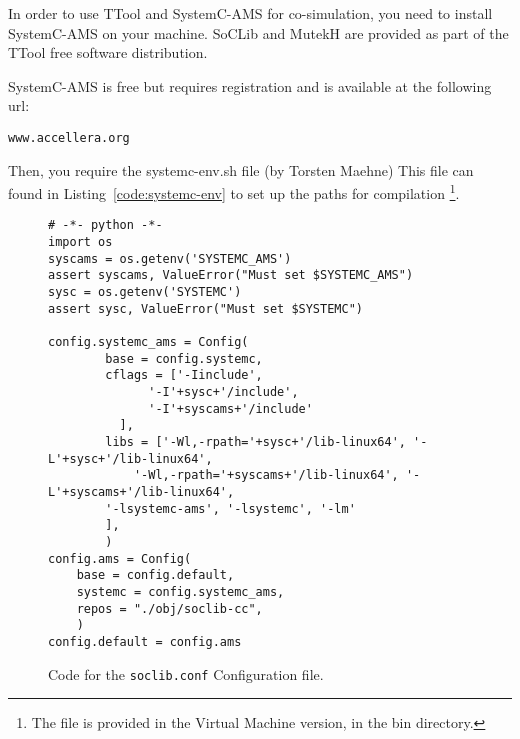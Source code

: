 In order to use TTool and SystemC-AMS for co-simulation,
you need to install SystemC-AMS on your machine.
SoCLib and MutekH are provided as part of the TTool free software distribution.

SystemC-AMS is free but requires registration and is available at the following url:

\texttt{www.accellera.org}

Then, you require the systemc-env.sh file (by Torsten Maehne)
This file can found in Listing~\ref{code:systemc-env} to set up the paths for compilation
\footnote{
The file is provided in the Virtual Machine version, in the bin directory.}.


\begin{figure}[h]
\begin{verbatim}
# -*- python -*-
import os
syscams = os.getenv('SYSTEMC_AMS')
assert syscams, ValueError("Must set $SYSTEMC_AMS")
sysc = os.getenv('SYSTEMC')
assert sysc, ValueError("Must set $SYSTEMC")

config.systemc_ams = Config(
        base = config.systemc,
        cflags = ['-Iinclude', 
              '-I'+sysc+'/include', 
              '-I'+syscams+'/include'
          ], 
        libs = ['-Wl,-rpath='+sysc+'/lib-linux64', '-L'+sysc+'/lib-linux64', 
            '-Wl,-rpath='+syscams+'/lib-linux64', '-L'+syscams+'/lib-linux64',
        '-lsystemc-ams', '-lsystemc', '-lm' 
        ],
        )
config.ams = Config(
    base = config.default,
    systemc = config.systemc_ams,
    repos = "./obj/soclib-cc",
    )
config.default = config.ams
\end{verbatim}
  \caption{Code for the \texttt{soclib.conf} Configuration file.}
  \label{code:soclib_conf_file}
\end{figure}
\newpage
